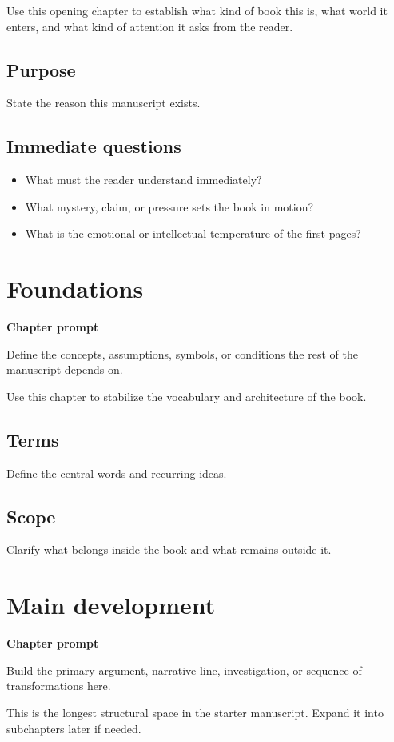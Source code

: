 \documentclass[11pt,openany]{book}
\newcommand{\chapterprompt}[1]{
\begin{chapterbox}
\textbf{Chapter prompt}\par
#1
\end{chapterbox}
}
\begin{document}
Use this opening chapter to establish what kind of book this is, what world it enters, and what kind of attention it asks from the reader.

\section{Purpose}

State the reason this manuscript exists.

\section{Immediate questions}

\begin{itemize}
  \item What must the reader understand immediately?
  \item What mystery, claim, or pressure sets the book in motion?
  \item What is the emotional or intellectual temperature of the first pages?
\end{itemize}

\chapter{Foundations}
\chapterprompt{Define the concepts, assumptions, symbols, or conditions the rest of the manuscript depends on.}

Use this chapter to stabilize the vocabulary and architecture of the book.

\section{Terms}

Define the central words and recurring ideas.

\section{Scope}

Clarify what belongs inside the book and what remains outside it.

\chapter{Main development}
\chapterprompt{Build the primary argument, narrative line, investigation, or sequence of transformations here.}

This is the longest structural space in the starter manuscript. Expand it into subchapters later if needed.
\end{document}
